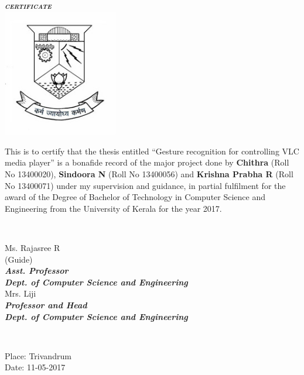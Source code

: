 \documentclass[a4paper,11pt]{article}
\begin{document}
	\begin{titlepage}
		\begin{centering}
			\textbf{\textit{\LARGE\textsc{{certificate}}}}\\[0.5cm]
			\includegraphics[width=5cm]{images/logo.jpg}\\

		\end{centering}

		\large{This is to certify that the thesis entitled ``Gesture recognition for controlling VLC media player'' is a bonafide record of the major project done by \textbf{Chithra} (Roll No 13400020), \textbf{Sindoora N} (Roll No 13400056) and \textbf{Krishna Prabha R} (Roll No 13400071) under my supervision and guidance, in partial fulfilment for the award of the Degree of Bachelor of Technology in Computer Science and Engineering from the University of Kerala for the year 2017.}\\[1.5cm]

		\begin{minipage}{0.4\textwidth}
		\begin{flushleft}
		\end{flushleft}
		\end{minipage}
		~
		\begin{minipage}{0.6\textwidth}
		\begin{centering} \large
		\large{Ms. Rajasree R}\\
		\small{(Guide)}\\
		\small{\textit{\textbf{Asst. Professor}}}\\
		\small{\textit{\textbf{Dept. of Computer Science and Engineering}}}\\[1.5cm]

		\large{Mrs. Liji}\\
		\small{\textit{\textbf{Professor and Head}}}\\
		\small{\textit{\textbf{Dept. of Computer Science and Engineering}}}\\
		\end{centering}
		\end{minipage}\\[1.0cm]

		\begin{flushleft}
		Place: Trivandrum\\
		Date:  11-05-2017\\
		\end{flushleft}
		\vfill %
	\end{titlepage}
\end{document}

